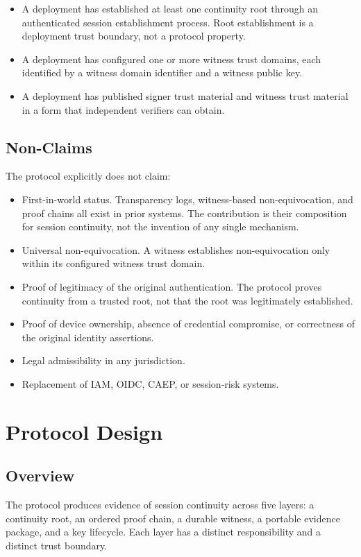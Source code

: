 \documentclass[11pt,a4paper]{article}
\begin{document}
\begin{itemize}
\item A deployment has established at least one continuity root through an authenticated session establishment process. Root establishment is a deployment trust boundary, not a protocol property.
\item A deployment has configured one or more witness trust domains, each identified by a witness domain identifier and a witness public key.
\item A deployment has published signer trust material and witness trust material in a form that independent verifiers can obtain.
\end{itemize}

\subsection{Non-Claims}

The protocol explicitly does not claim:

\begin{itemize}
\item First-in-world status. Transparency logs, witness-based non-equivocation, and proof chains all exist in prior systems. The contribution is their composition for session continuity, not the invention of any single mechanism.
\item Universal non-equivocation. A witness establishes non-equivocation only within its configured witness trust domain.
\item Proof of legitimacy of the original authentication. The protocol proves continuity from a trusted root, not that the root was legitimately established.
\item Proof of device ownership, absence of credential compromise, or correctness of the original identity assertions.
\item Legal admissibility in any jurisdiction.
\item Replacement of IAM, OIDC, CAEP, or session-risk systems.
\end{itemize}
\section{Protocol Design}

\subsection{Overview}

The protocol produces evidence of session continuity across five layers: a continuity root, an ordered proof chain, a durable witness, a portable evidence package, and a key lifecycle. Each layer has a distinct responsibility and a distinct trust boundary.
\end{document}
